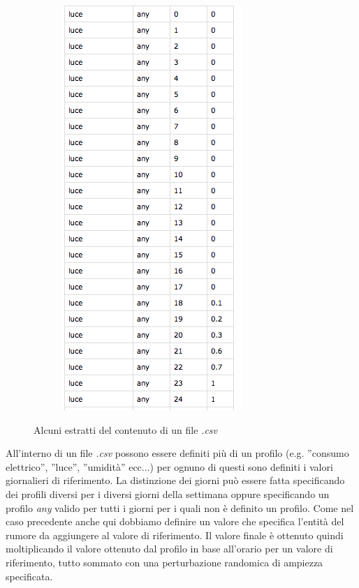 \documentclass[12pt,a4paper,italian]{article}
\begin{document}
\begin{figure}[!h]
\begin{subfigure}{.3\textwidth}
		\includegraphics[width=.8\linewidth]{img/profilo2.png}
	\end{subfigure}
	\caption{Alcuni estratti del contenuto di un file \emph{.csv}}\label{csvfile}
\end{figure}
All'interno di un file \emph{.csv} possono essere definiti più di un profilo (e.g. ''consumo elettrico'', ''luce'', ''umidità''  ecc...) per ognuno di questi sono definiti i valori giornalieri di riferimento. La distinzione dei giorni può essere fatta specificando dei profili diversi per i diversi giorni della settimana oppure specificando un profilo \emph{any} valido per tutti i giorni per i quali non è definito un profilo. Come nel caso precedente anche qui dobbiamo definire un valore che specifica l'entità del rumore da aggiungere al valore di riferimento. Il valore finale è ottenuto quindi moltiplicando il valore ottenuto dal profilo in base all'orario per un valore di riferimento, tutto sommato con una perturbazione randomica di ampiezza specificata.\\
\end{document}
